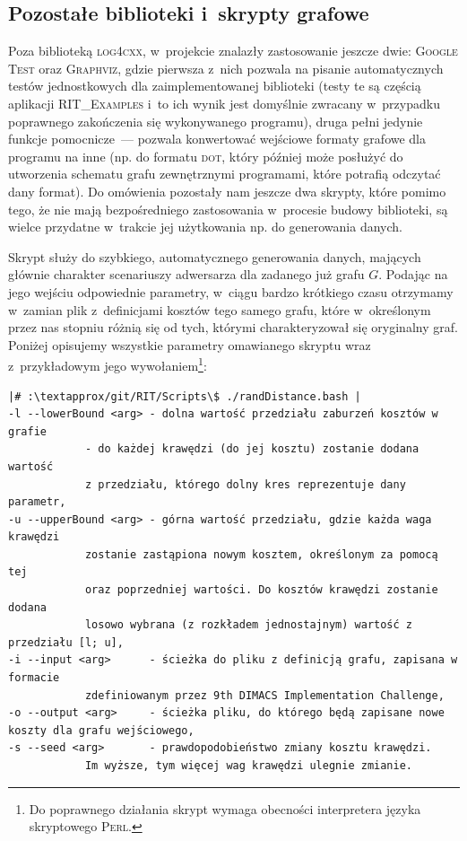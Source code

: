 \subsection{Pozostałe biblioteki i~skrypty grafowe}



Poza biblioteką \textsc{log4cxx}, w~projekcie znalazły zastosowanie jeszcze dwie: \textsc{Google Test} oraz \textsc{Graphviz}, gdzie pierwsza z~nich pozwala na pisanie automatycznych testów jednostkowych dla zaimplementowanej biblioteki (testy te są częścią aplikacji \textsc{RIT\_Examples} i~to ich wynik jest domyślnie zwracany w~przypadku poprawnego zakończenia się wykonywanego programu), druga pełni jedynie funkcje pomocnicze~--- pozwala konwertować wejściowe formaty grafowe dla programu na inne (np. do formatu \textsc{dot}, który później może posłużyć do utworzenia schematu grafu zewnętrznymi programami, które potrafią odczytać dany format).
Do omówienia pozostały nam jeszcze dwa skrypty, które pomimo tego, że nie mają bezpośredniego zastosowania w~procesie budowy biblioteki, są wielce przydatne w~trakcie jej użytkowania np. do generowania danych.


Skrypt służy do szybkiego, automatycznego generowania danych, mających głównie charakter scenariuszy adwersarza dla zadanego już grafu $G$.
Podając na jego wejściu odpowiednie parametry, w~ciągu bardzo krótkiego czasu otrzymamy w~zamian plik z~definicjami kosztów tego samego grafu, które w~określonym przez nas stopniu różnią się od tych, którymi charakteryzował się oryginalny graf.
Poniżej opisujemy wszystkie parametry omawianego skryptu wraz z~przykładowym jego wywołaniem\footnote{
	Do poprawnego działania skrypt wymaga obecności interpretera języka skryptowego \textsc{Perl}.
}:

\begin{verbatim}
|# :\textapprox/git/RIT/Scripts\$ ./randDistance.bash |
-l --lowerBound <arg> - dolna wartość przedziału zaburzeń kosztów w grafie 
			- do każdej krawędzi (do jej kosztu) zostanie dodana wartość 
			z przedziału, którego dolny kres reprezentuje dany parametr,
-u --upperBound <arg> - górna wartość przedziału, gdzie każda waga krawędzi
			zostanie zastąpiona nowym kosztem, określonym za pomocą tej 
			oraz poprzedniej wartości. Do kosztów krawędzi zostanie dodana 
			losowo wybrana (z rozkładem jednostajnym) wartość z przedziału [l; u],
-i --input <arg>      - ścieżka do pliku z definicją grafu, zapisana w formacie 
			zdefiniowanym przez 9th DIMACS Implementation Challenge,
-o --output <arg>     - ścieżka pliku, do którego będą zapisane nowe koszty dla grafu wejściowego,
-s --seed <arg>       - prawdopodobieństwo zmiany kosztu krawędzi. 
			Im wyższe, tym więcej wag krawędzi ulegnie zmianie.
\end{verbatim}

